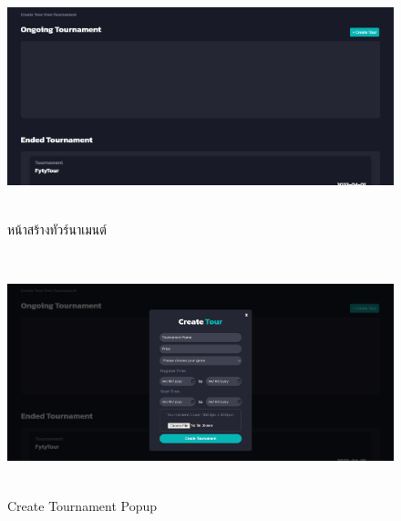     \begin{figure}[ht]
      \begin{center}
      \includegraphics[width=18cm,height=7cm,keepaspectratio]{create_tour.png}
      \end{center}
      \caption[หน้าสร้างทัวร์นาเมนต์]{หน้าสร้างทัวร์นาเมนต์}
      \label{fig:หน้าสร้างทัวร์นาเมนต์}
    \end{figure}
    \begin{figure}[ht]
      \begin{center}
      \includegraphics[width=18cm,height=7cm,keepaspectratio]{create_tour_popup.png}
      \end{center}
      \caption[Create Tournament Popup]{Create Tournament Popup}
      \label{fig:Create Tournament Popup}
    \end{figure}

